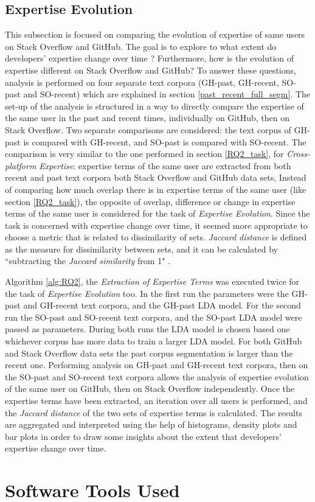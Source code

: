     \subsection{Expertise Evolution\label{RQ4_task}}
        
        This subsection is focused on comparing the evolution of expertise of same users on Stack Overflow and GitHub. The goal is to explore to what extent do developers' expertise change over time ? Furthermore, how is the evolution of expertise different on Stack Overflow and GitHub? To answer these questions, analysis is performed on four separate text corpora (GH-past, GH-recent, SO-past and SO-recent) which are explained in section \ref{past_recent_full_segm}. The set-up of the analysis is structured in a way to directly compare the expertise of the same user in the past and recent times, individually on GitHub, then on Stack Overflow. Two separate comparisons are considered: the text corpus of GH-past is compared with GH-recent, and SO-past is compared with SO-recent. The comparison is very similar to the one performed in section \ref{RQ2_task}, for \emph{Cross-platform Expertise}: expertise terms of the same user are extracted from both recent and past text corpora both Stack Overflow and GitHub data sets, Instead of comparing how much overlap there is in expertise terms of the same user (like section \ref{RQ2_task}), the opposite of overlap, difference or change in expertise terms of the same user is considered for the task of \emph{Expertise Evolution}. Since the task is concerned with expertise change over time, it seemed more appropriate to choose a metric that is related to dissimilarity of sets. \emph{Jaccard distance} is defined as the measure for dissimilarity between sets, and it can be calculated by ``subtracting the \emph{Jaccard similarity} from 1" \cite{jaccard_wiki}.
        
        Algorithm \ref{alg:RQ2}, the \emph{Extraction of Expertise Terms} was executed twice for the task of \emph{Expertise Evolution} too. In the first run the parameters were the GH-past and GH-recent text corpora, and the GH-past LDA model. For the second run the SO-past and SO-recent text corpora, and the SO-past LDA model were passed as parameters. During both runs the LDA model is chosen based one whichever corpus has more data to train a larger LDA model. For both GitHub and Stack Overflow data sets the past corpus segmentation is larger than the recent one. Performing analysis on GH-past and GH-recent text corpora, then on the SO-past and SO-recent text corpora allows the analysis of expertise evolution of the same user on GitHub, then on Stack Overflow independently. Once the expertise terms have been extracted, an iteration over all users is performed, and the \emph{Jaccard distance} of the two sets of expertise terms is calculated. The results are aggregated and interpreted using the help of histograms, density plots and bar plots in order to draw some insights about the extent that developers' expertise change over time.

\section{Software Tools Used}



    
